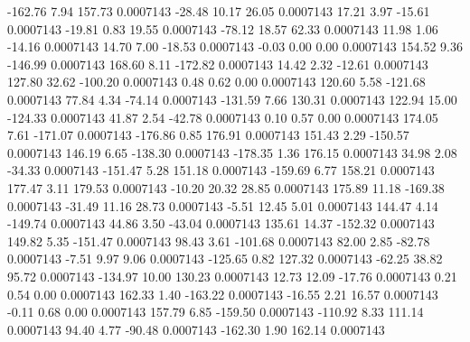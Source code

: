      -162.76        7.94      157.73     0.0007143
      -28.48       10.17       26.05     0.0007143
       17.21        3.97      -15.61     0.0007143
      -19.81        0.83       19.55     0.0007143
      -78.12       18.57       62.33     0.0007143
       11.98        1.06      -14.16     0.0007143
       14.70        7.00      -18.53     0.0007143
       -0.03        0.00        0.00     0.0007143
      154.52        9.36     -146.99     0.0007143
      168.60        8.11     -172.82     0.0007143
       14.42        2.32      -12.61     0.0007143
      127.80       32.62     -100.20     0.0007143
        0.48        0.62        0.00     0.0007143
      120.60        5.58     -121.68     0.0007143
       77.84        4.34      -74.14     0.0007143
     -131.59        7.66      130.31     0.0007143
      122.94       15.00     -124.33     0.0007143
       41.87        2.54      -42.78     0.0007143
        0.10        0.57        0.00     0.0007143
      174.05        7.61     -171.07     0.0007143
     -176.86        0.85      176.91     0.0007143
      151.43        2.29     -150.57     0.0007143
      146.19        6.65     -138.30     0.0007143
     -178.35        1.36      176.15     0.0007143
       34.98        2.08      -34.33     0.0007143
     -151.47        5.28      151.18     0.0007143
     -159.69        6.77      158.21     0.0007143
      177.47        3.11      179.53     0.0007143
      -10.20       20.32       28.85     0.0007143
      175.89       11.18     -169.38     0.0007143
      -31.49       11.16       28.73     0.0007143
       -5.51       12.45        5.01     0.0007143
      144.47        4.14     -149.74     0.0007143
       44.86        3.50      -43.04     0.0007143
      135.61       14.37     -152.32     0.0007143
      149.82        5.35     -151.47     0.0007143
       98.43        3.61     -101.68     0.0007143
       82.00        2.85      -82.78     0.0007143
       -7.51        9.97        9.06     0.0007143
     -125.65        0.82      127.32     0.0007143
      -62.25       38.82       95.72     0.0007143
     -134.97       10.00      130.23     0.0007143
       12.73       12.09      -17.76     0.0007143
        0.21        0.54        0.00     0.0007143
      162.33        1.40     -163.22     0.0007143
      -16.55        2.21       16.57     0.0007143
       -0.11        0.68        0.00     0.0007143
      157.79        6.85     -159.50     0.0007143
     -110.92        8.33      111.14     0.0007143
       94.40        4.77      -90.48     0.0007143
     -162.30        1.90      162.14     0.0007143
